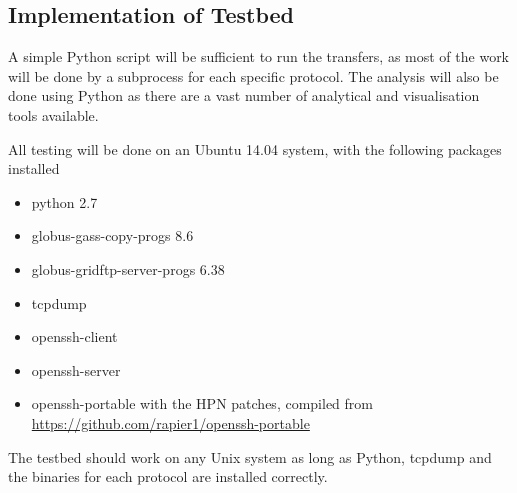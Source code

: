 \documentclass{sig-alternate-05-2015}
\begin{document}
\subsection{Implementation of Testbed}
A simple Python script will be sufficient to run the transfers, as most of the work will be done by a subprocess for each specific protocol. The analysis will also be done using Python as there are a vast number of analytical and visualisation tools available.

All testing will be done on an Ubuntu 14.04 system, with the following packages installed
\begin{itemize}
	\item python 2.7
	\item globus-gass-copy-progs 8.6
	\item globus-gridftp-server-progs 6.38
	\item tcpdump
	\item openssh-client
	\item openssh-server
	\item openssh-portable with the HPN patches, compiled from \url{https://github.com/rapier1/openssh-portable}
\end{itemize}
The testbed should work on any Unix system as long as Python, tcpdump and the binaries for each protocol are installed correctly.
\end{document}
